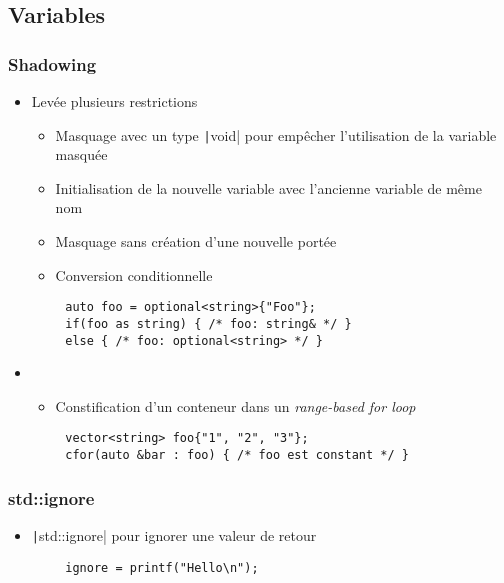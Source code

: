 \documentclass[C++.tex]{subfiles}
\begin{document}
\subsection*{Variables}
\begin{frame}[fragile]
	\frametitle{Shadowing}
	\begin{itemize}
		\item Levée plusieurs restrictions
		\begin{itemize}
			\item Masquage avec un type \texttt|void| pour empêcher l'utilisation de la variable masquée
			\item Initialisation de la nouvelle variable avec l'ancienne variable de même nom
			\item Masquage sans création d'une nouvelle portée
			\item Conversion conditionnelle
		\end{itemize}
	\end{itemize}

	\begin{verbatim}
		auto foo = optional<string>{"Foo"};
		if(foo as string) { /* foo: string& */ }
		else { /* foo: optional<string> */ }
	\end{verbatim}
		
	\begin{itemize}
		\item []
		\begin{itemize}
			\item Constification d'un conteneur dans un \textit{range-based for loop}
		\end{itemize}
	\end{itemize}

	\begin{verbatim}
		vector<string> foo{"1", "2", "3"};
		cfor(auto &bar : foo) { /* foo est constant */ }
	\end{verbatim}
\end{frame}

\begin{frame}[fragile]
	\frametitle{{\NoAutoSpacing std::ignore}}
	\begin{itemize}
		\item \texttt|std::ignore| pour ignorer une valeur de retour

	\end{itemize}

	\begin{verbatim}
		ignore = printf("Hello\n");
	\end{verbatim}
\end{frame}
\end{document}
